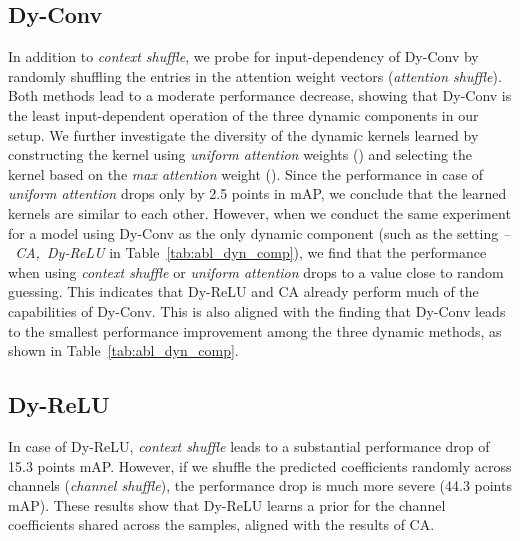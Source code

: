 \documentclass[lettersize,journal]{IEEEtran}
\begin{document}
\subsection{Dy-Conv}
\label{subsec:inspecting_dy_conv}

In addition to \textit{context shuffle}, we probe for input-dependency of Dy-Conv by randomly shuffling the  entries in the attention weight vectors (\textit{attention shuffle}). Both methods lead to a moderate performance decrease, showing that Dy-Conv is the least input-dependent operation of the three dynamic components in our setup. We further investigate the diversity of the  dynamic kernels learned by constructing the kernel  using \textit{uniform attention} weights () and selecting the kernel  based on the \textit{max attention} weight (). Since the performance in case of \textit{uniform attention} drops only by 2.5 points in mAP, we conclude that the learned kernels are similar to each other. However, when we conduct the same experiment for a model using Dy-Conv as the only dynamic component (such as the setting \mbox{\textit{-- CA, Dy-ReLU}} in Table~\ref{tab:abl_dyn_comp}), we find that the performance when using \textit{context shuffle} or \textit{uniform attention} drops to a value close to random guessing. This indicates that Dy-ReLU and CA already perform much of the capabilities of Dy-Conv. This is also aligned with the finding that Dy-Conv leads to the smallest performance improvement among the three dynamic methods, as shown in Table~\ref{tab:abl_dyn_comp}.

\subsection{Dy-ReLU}
\label{subsec:inspecting_dy_relu}

In case of Dy-ReLU, \textit{context shuffle} leads to a substantial performance drop of 15.3 points mAP. However, if we shuffle the predicted coefficients randomly across channels (\textit{channel shuffle}), the performance drop is much more severe (44.3 points mAP). These results show that Dy-ReLU learns a prior for the channel coefficients shared across the samples, aligned with the results of CA. 
\end{document}
